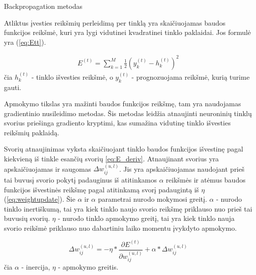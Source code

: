 Backpropagation metodas

Atliktus įvesties reikšmių perleidimą per tinklą yra skaičiuojamas baudos funkcijos reikšmė, kuri yra lygi vidutinei kvadratinei tinklo paklaidai. Jos formulė yra (\ref{eq:Ett}).

%

\begin{equation} \label{eq:Ett}
  \begin{aligned}
  E^{(t)} = \sum_{k=1}^{M} \frac{1}{2}(y_k^{(t)} - h_k^{(t)})^{2}
  \end{aligned}
\end{equation}
čia $h_k^{(t)}$ - tinklo išvesties reikšmė, o $y_k^{(t)}$ - prognozuojama reikšmė, kurią turime gauti.

Apmokymo tikslas yra mažinti baudos funkcijos reikšmę, tam yra naudojamas gradientinio nusileidimo metodas. Šis metodas leidžia atnaujinti neuroninių tinklų svorius priešinga gradiento kryptimi, kas sumažina vidutinę tinklo išvesties reikšmių paklaidą.

 Svorių atnaujinimas vyksta skaičiuojant tinklo baudos funkcijos išvestinę pagal kiekvieną iš tinkle esančių svorių \ref{eq:E_deriv}. Atnaujinant svorius yra apskaičiuojamas ir saugomas $\Delta w_{ij}^{(u,l)}$. Jis yra apskaičiuojamas naudojant prieš tai buvusį svorio pokytį padauginus iš atitinkamos $\alpha$ reikšmės ir atėmus baudos funkcijos išvestinės reikšmę pagal atitinkamą svorį padaugintą iš $\eta$ (\ref{eq:weightupdate}). Šie $\alpha $ ir $\alpha$ parametrai nurodo mokymosi greitį. $\alpha$ - nurodo tinklo inertiškumą, tai yra kiek tinklo naujo svorio reikšmę priklauso nuo prieš tai buvusių svorių. $\eta$ - nurodo tinklo apmokymo greitį, tai yra kiek tinklo nauja svorio reikšmė priklauso nuo dabartiniu laiko momentu įvykdyto apmokymo.


\begin{equation}\label{eq:weightupdate}
  \Delta w_{ij}^{(u,l)} = -\eta*\frac{\partial E^{(t)}}{\partial w_{ij}^{(u,l)}} + \alpha*\Delta w_{ij}^{(u,l)}
\end{equation}
čia $\alpha$ - inercija, $\eta$ - apmokymo greitis.

